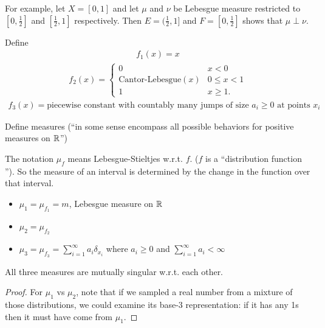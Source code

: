 \begin{example}
  For example, let $X = [0, 1]$ and let $\mu$ and $\nu$ be Lebesgue measure restricted to $[0,\frac{1}{2}]$
  and $[\frac{1}{2} , 1]$ respectively. Then $E = (\frac{1}{2} , 1]$ and $F = [0,\frac{1}{2}]$ shows
  that $\mu \perp \nu$.
\end{example}

\begin{example}
  Define
  \begin{align*}
    f_1(x) = x
  \end{align*}
  \begin{align*}
      f_2(x) =
      \begin{cases}
        0                         & x < 0 \\
        \text{Cantor-Lebesgue}(x) & 0 \leq x < 1 \\
        1                         & x \geq 1.
      \end{cases}
    \end{align*}
    \begin{align*}
      f_3(x) = \text{piecewise constant with countably many jumps of size $a_i \geq 0$ at points $x_i$}
    \end{align*}

    Define measures (``in some sense encompass all possible behaviors for positive measures on $\mathbb{R}$​'')

    The notation $\mu_f$ means Lebesgue-Stieltjes w.r.t. $f$. ($f$ is a ``distribution function​'').
    So the measure of an interval is determined by the change in the function over that interval.

  \begin{itemize}
  \item $\mu_1 = \mu_{f_1} = m$, Lebesgue measure on $\mathbb{R}$
  \item $\mu_2 = \mu_{f_2}$
  \item $\mu_3 = \mu_{f_3} = \sum_{i=1}^\infty a_i \delta_{x_i}$ where $a_i \geq 0$ and $\sum_{i=1}^\infty a_i < \infty$
  \end{itemize}

  \begin{claim*}
    All three measures are mutually singular w.r.t. each other.
  \end{claim*}

  \begin{proof}
    For $\mu_1$ vs $\mu_2$, note that if we sampled a real number from a mixture of those
    distributions, we could examine its base-3 representation: if it has any 1s then it must have
    come from $\mu_1$.


\end{proof}
\end{example}
